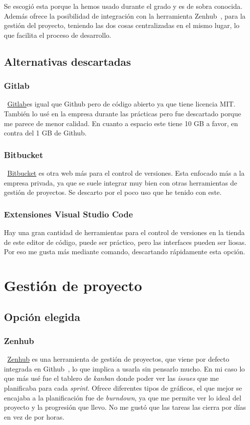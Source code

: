Se escogió esta porque la hemos usado durante el grado y es de sobra conocida. Además ofrece la posibilidad de integración con la herramienta Zenhub~\pageref{zenhub}, para la gestión del proyecto, teniendo las dos cosas centralizadas en el mismo lugar, lo que facilita el proceso de desarrollo.

\subsection{Alternativas descartadas}

\subsubsection{Gitlab}
~\href{https://gitlab.com/}{Gitlab}es igual que Github pero de código abierto ya que tiene licencia MIT. También lo usé en la empresa durante las prácticas pero fue descartado porque me parece de menor calidad. En cuanto a espacio este tiene 10 GB a favor, en contra del 1 GB de Github.

\subsubsection{Bitbucket}
~\href{https://bitbucket.org/product//}{Bitbucket} es otra web más para el control de versiones. Esta enfocado más a la empresa privada, ya que se suele integrar muy bien con otras herramientas de gestión de proyectos. Se descarto por el poco uso que he tenido con este.

\subsubsection{Extensiones Visual Studio Code}
Hay una gran cantidad de herramientas para el control de versiones en la tienda de este editor de código, puede ser práctico, pero las interfaces pueden ser liosas. Por eso me gusta más mediante comando, descartando rápidamente esta opción.


\section{Gestión de proyecto}

\subsection{Opción elegida}

\subsubsection{Zenhub}\label{zenhub}
~\href{https://bitbucket.org/product//}{Zenhub} es una herramienta de gestión de proyectos, que viene por defecto integrada en Github~\pageref{github}, lo que implica a usarla sin pensarlo mucho. En mi caso lo que más usé fue el tablero de \emph{kanban} donde poder ver las \emph{issues} que me planificaba para cada \emph{sprint}. Ofrece diferentes tipos de gráficos, el que mejor se encajaba a la planificación fue de \emph{burndown}, ya que me permite ver lo ideal del proyecto y la progresión que llevo. No me gustó que las tareas las cierra por días en vez de por horas.

